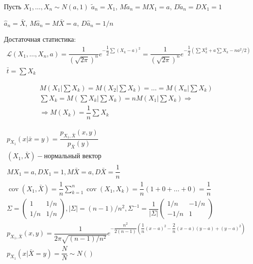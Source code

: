 \begin{ex}
  Пусть $X_1, \dots, X_n \sim N(a, 1)$
  $\tilde a_n = X_1$, $M\tilde a_n = MX_1 = a$, $D\tilde a_n = D X_1 = 1$

  $\hat a_n = \bar X$, $M \hat a_n = M\bar X = a$, $D \hat a_n = 1/n$

  Достаточная статистика:
  \begin{multline*}
    \mathcal{L}(X_1, \dots, X_n, a)
    = \dfrac{1}{(\sqrt{2\pi})^n} e^{-\dfrac{1}{2} \sum (X_k - a)^2}
    = \dfrac{1}{(\sqrt{2\pi})^n} e^{-\dfrac{1}{2} (\sum X_k^2 + a \sum X_k - na^2 / 2)} \\
    \bar t = \sum X_k
  \end{multline*}

  \begin{multline*}
    M(X_1 | \sum X_k) = M(X_2 | \sum X_k) = \dots = M(X_n | \sum X_k) \\
    \sum X_k = M(\sum X_k | \sum X_k) = n M(X_1 | \sum X_k) \Rightarrow \\
    \Rightarrow M(X_k) = \dfrac{1}{n} \sum X_k
  \end{multline*}

  \begin{multline*}
    p_{X_1} (x | \bar x = y) = \dfrac{p_{X_1, \bar X} (x, y)}{p_{\bar X} (y)} \\
    (X_1, \bar X) - \text{нормальный вектор} \\
    MX_1 = a, DX_1 = 1, M\bar X = a, D\bar X = \dfrac{1}{n} \\
    \operatorname{cov} (X_1, \bar X) = \dfrac{1}{n} \sum_{k=1}^n \operatorname{cov} (X_1, X_k) = \dfrac{1}{n} (1 + 0 + \dots + 0) = \dfrac{1}{n} \\
    \Sigma = \begin{pmatrix}
      1 & 1/n \\
      1/n & 1/n
    \end{pmatrix},
    |\Sigma| = (n-1) / n^2,
    \Sigma^{-1} = \dfrac{1}{|\Sigma|} \begin{pmatrix}
      1/n & - 1/n \\
      -1/n & 1
    \end{pmatrix} \\
    p_{X_1, \bar X} (x, y)
    = \dfrac{1}{2\pi \sqrt{(n-1) / n^2}} e^{- \dfrac{n^2}{2(n-1)} \left( \dfrac{1}{n}(x-a)^2 - \dfrac{2}{n} (x-a)(y-a) + (y-a)^2 \right) } \\
    p_{X_1} (x | \bar X = y) = \dfrac{N}{N} \sim N() 
  \end{multline*}
\end{ex}

